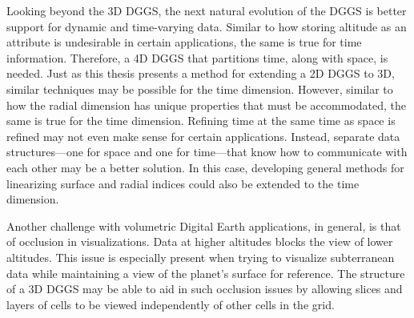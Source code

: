 Looking beyond the 3D DGGS, the next natural evolution of the DGGS is better support for dynamic and time-varying data.
Similar to how storing altitude as an attribute is undesirable in certain applications, the same is true for time information.
Therefore, a 4D DGGS that partitions time, along with space, is needed.
Just as this thesis presents a method for extending a 2D DGGS to 3D, similar techniques may be possible for the time dimension.
However, similar to how the radial dimension has unique properties that must be accommodated, the same is true for the time dimension.
Refining time at the same time as space is refined may not even make sense for certain applications.
Instead, separate data structures---one for space and one for time---that know how to communicate with each other may be a better solution.
In this case, developing general methods for linearizing surface and radial indices could also be extended to the time dimension.


Another challenge with volumetric Digital Earth applications, in general, is that of occlusion in visualizations.
Data at higher altitudes blocks the view of lower altitudes.
This issue is especially present when trying to visualize subterranean data while maintaining a view of the planet's surface for reference.
The structure of a 3D DGGS may be able to aid in such occlusion issues by allowing slices and layers of cells to be viewed independently of other cells in the grid.
